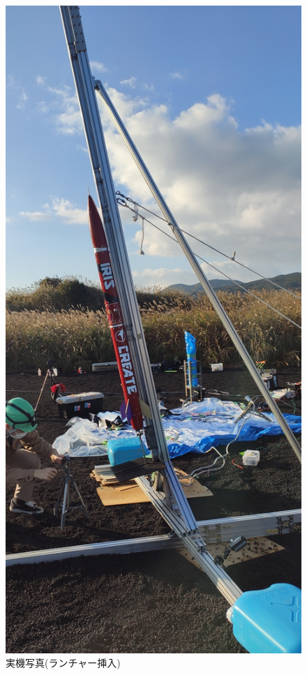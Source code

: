 \documentclass[a4paper,11pt,titlepage,uplatex]{jsarticle}
\begin{document}
\begin{figure}[H]
    \centering
    \includegraphics[scale = 0.1]{pic_str/s_59_launcher.jpg}
    \caption{実機写真(ランチャー挿入)}
    \label{s_real2}
\end{figure}
\end{document}

